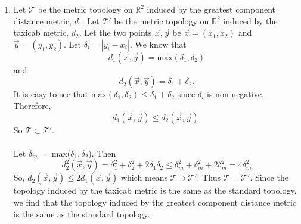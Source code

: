 \documentclass{article}
\begin{document}
\begin{enumerate}
\item
Let $\mathcal{T}$ be the metric topology on $\mathbb{R}^2$ induced by the greatest component distance metric, $d_1$. Let $\mathcal{T'}$ be the metric topology on $\mathbb{R}^2$ induced by the taxicab metric, $d_2$. Let the two points $\vec{x},\vec{y}$ be $\vec{x}=(x_1,x_2)$ and $\vec{y}=(y_1,y_2)$. Let $\delta_i = |y_i - x_i|$. We know that \[d_1(\vec{x},\vec{y}) = \textrm{max}(\delta_1, \delta_2)\] and \[d_2(\vec{x},\vec{y}) = \delta_1+\delta_2.\]
It is easy to see that max$(\delta_1, \delta_2) \le \delta_1+\delta_2$ since $\delta_i$ is non-negative. Therefore, 
\[d_1(\vec{x},\vec{y}) \le d_2(\vec{x},\vec{y}).\] So $\mathcal{T} \subset \mathcal{T'}$.
\\\\Let $\delta_m = $ max($\delta_1,\delta_2$). Then 
\[d^2_2(\vec{x},\vec{y})=\delta^2_1+\delta^2_2+2\delta_1\delta_2 \le \delta^2_m+\delta^2_m+2\delta^2_m = 4\delta^2_m\]
So, $d_2(\vec{x},\vec{y}) \le 2d_1(\vec{x},\vec{y})$ which means $\mathcal{T} \supset \mathcal{T'}$. Thus $\mathcal{T} = \mathcal{T'}$. Since the topology induced by the taxicab metric is the same as the standard topology, we find that the topology induced by the greatest component distance metric is the same as the standard topology.



\end{enumerate}
\end{document}
